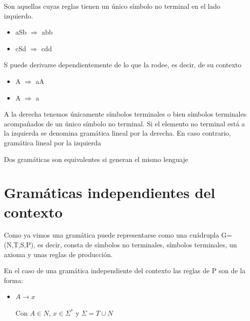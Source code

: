 \documentclass{apuntes}
\begin{document}
\begin{defn}
Son aquellas cuyas reglas tienen un único símbolo no terminal en el lado izquierdo.
\end{defn}


\begin{example}
\begin{itemize}
\item aSb $\Rightarrow$ abb
\item cSd $\Rightarrow$ cdd
\end{itemize}
S puede derivarse dependientemente de lo que la rodee, es decir, de su contexto
\end{example}

\begin{example}
\begin{itemize}
\item A $\Rightarrow$ aA
\item A $\Rightarrow$ a
\end{itemize}
A la derecha tenemos únicamente símbolos terminales o bien símbolos terminales acompañados de un único símbolo no terminal.
Si el elemento no terminal está a la izquierda se denomina gramática lineal por la derecha. En caso contrario, gramática lineal por la izquierda
\end{example}

\begin{defn}
Dos gramáticas son equivalentes si generan el mismo lenguaje
\end{defn}

\section{Gramáticas independientes del contexto}
Como ya vimos una gramática puede representarse como una cuádrupla G=(N,T,S,P), es decir, consta de símbolos no terminales, símbolos terminales, un axioma y unas reglas de producción.

En el caso de una gramática independiente del contexto las reglas de P son de la forma:
\begin{itemize}
\item $A \rightarrow x$

Con $A\in N$, $x \in \Sigma^*$ y $\Sigma=T\cup N$
\end{itemize}
\end{document}
